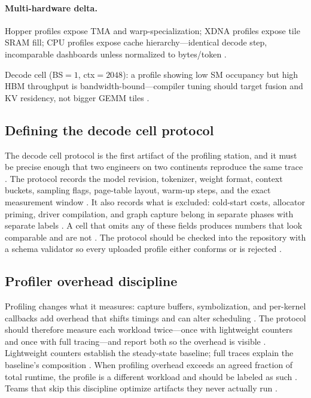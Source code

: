 \paragraph{Multi-hardware delta.} Hopper profiles expose TMA and warp-specialization; XDNA profiles expose tile SRAM fill; CPU profiles expose cache hierarchy---identical decode step, incomparable dashboards unless normalized to bytes/token \citep{semianalysis2024tma,amd2024xdna,dlbook}.

\begin{example}
Decode cell (BS${=}1$, ctx${=}2048$): a profile showing low SM occupancy but high HBM throughput is bandwidth-bound---compiler tuning should target fusion and KV residency, not bigger GEMM tiles \citep{memoryfloor2026,patel2025llminference,dao2022flashattention}.
\end{example}

\subsection{Defining the decode cell protocol}

The decode cell protocol is the first artifact of the profiling station, and it must be precise enough that two engineers on two continents reproduce the same trace \citep{patel2025llminference,memoryfloor2026,taxbreak2026}. The protocol records the model revision, tokenizer, weight format, context buckets, sampling flags, page-table layout, warm-up steps, and the exact measurement window \citep{kwon2023vllm,chen2020compilerbasedhardw}. It also records what is excluded: cold-start costs, allocator priming, driver compilation, and graph capture belong in separate phases with separate labels \citep{nvidia2024cudagraphs,memoryfloor2026}. A cell that omits any of these fields produces numbers that look comparable and are not \citep{patel2025llminference,chen2020compilerbasedhardw}. The protocol should be checked into the repository with a schema validator so every uploaded profile either conforms or is rejected \citep{memoryfloor2026,taxbreak2026}.

\subsection{Profiler overhead discipline}

Profiling changes what it measures: capture buffers, symbolization, and per-kernel callbacks add overhead that shifts timings and can alter scheduling \citep{patel2025llminference,semianalysis2024tma,memoryfloor2026}. The protocol should therefore measure each workload twice—once with lightweight counters and once with full tracing—and report both so the overhead is visible \citep{chen2020compilerbasedhardw,taxbreak2026}. Lightweight counters establish the steady-state baseline; full traces explain the baseline's composition \citep{memoryfloor2026,patel2025llminference}. When profiling overhead exceeds an agreed fraction of total runtime, the profile is a different workload and should be labeled as such \citep{taxbreak2026,chen2020compilerbasedhardw}. Teams that skip this discipline optimize artifacts they never actually run \citep{memoryfloor2026,patel2025llminference}.

